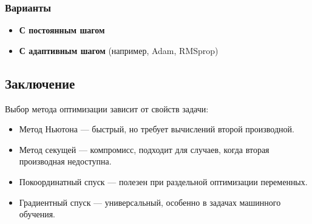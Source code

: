 \subsubsection{Варианты}
\begin{itemize}
    \item \textbf{С постоянным шагом}
    \item \textbf{С адаптивным шагом} (например, Adam, RMSprop)
\end{itemize}

\subsection{Заключение}
Выбор метода оптимизации зависит от свойств задачи:
\begin{itemize}
    \item Метод Ньютона — быстрый, но требует вычислений второй производной.
    \item Метод секущей — компромисс, подходит для случаев, когда вторая производная недоступна.
    \item Покоординатный спуск — полезен при раздельной оптимизации переменных.
    \item Градиентный спуск — универсальный, особенно в задачах машинного обучения.
\end{itemize}
